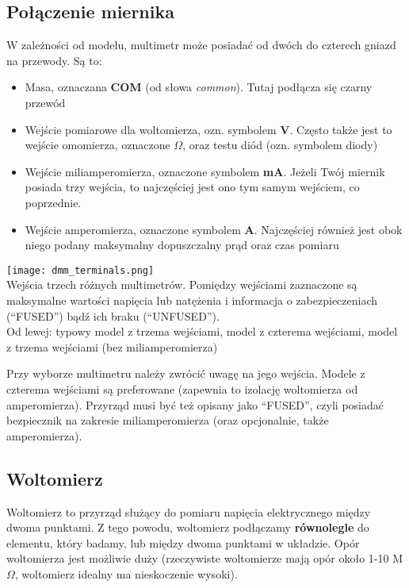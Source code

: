 \documentclass{pdfBooklets}
\begin{document}
\subsection{Połączenie miernika}
W zależności od modelu, multimetr może posiadać od dwóch do czterech gniazd na przewody. Są to:
\begin{itemize}
\item Masa, oznaczana \textbf{COM} (od słowa \textit{common}). Tutaj podłącza się czarny przewód
\item Wejście pomiarowe dla woltomierza, ozn. symbolem \textbf{V}. Często także jest to wejście omomierza, oznaczone \textbf{$\Omega$},
  oraz testu diód (ozn. symbolem diody)
\item Wejście miliamperomierza, oznaczone symbolem \textbf{mA}. Jeżeli Twój miernik posiada trzy wejścia, to najczęściej jest ono
  tym samym wejściem, co poprzednie.
\item Wejście amperomierza, oznaczone symbolem \textbf{A}. Najczęściej również jest obok niego podany maksymalny dopuszczalny prąd
  oraz czas pomiaru
\end{itemize}

\begin{Ramka}{}\begin{center}
  {\noindent\texttt{[image: dmm\_terminals.png]}}\\
  \small
  Wejścia trzech różnych multimetrów. Pomiędzy wejściami zaznaczone są maksymalne wartości napięcia lub natężenia i informacja o zabezpieczeniach
  (``FUSED'') bądź ich braku (``UNFUSED'').\\
  Od lewej: typowy model z trzema wejściami, model z czterema wejściami, model z trzema wejściami (bez miliamperomierza)
\end{center}\end{Ramka}

Przy wyborze multimetru należy zwrócić uwagę na jego wejścia. Modele z czterema wejściami są preferowane (zapewnia to izolację woltomierza
od amperomierza). Przyrząd musi być też opisany jako ``FUSED'', czyli posiadać bezpiecznik na zakresie miliamperomierza (oraz opcjonalnie,
także amperomierza).

\subsection{Woltomierz}
Woltomierz to przyrząd służący do pomiaru napięcia elektrycznego między dwoma punktami. Z tego powodu, woltomierz podłączamy
\textbf{równolegle} do elementu, który badamy, lub między dwoma punktami w układzie. Opór woltomierza jest możliwie duży (rzeczywiste
woltomierze mają opór około 1-10 M$\Omega$, woltomierz idealny ma nieskoczenie wysoki).
\end{document}
